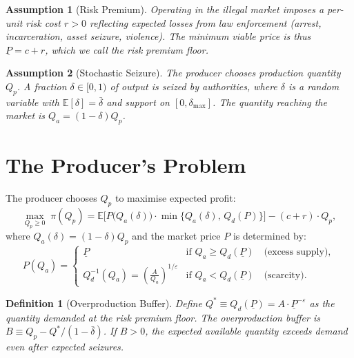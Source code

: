 \documentclass[12pt, a4paper]{article}
\newtheorem{assumption}{Assumption}
\newtheorem{definition}{Definition}
\begin{document}
\begin{assumption}[Risk Premium]
\label{ass:risk}
Operating in the illegal market imposes a per-unit risk cost $r > 0$ reflecting expected losses from law enforcement (arrest, incarceration, asset seizure, violence). The minimum viable price is thus $\underline{P} = c + r$, which we call the \textit{risk premium floor}.
\end{assumption}

\begin{assumption}[Stochastic Seizure]
\label{ass:seizure}
The producer chooses production quantity $Q_p$. A fraction $\delta \in [0,1)$ of output is seized by authorities, where $\delta$ is a random variable with $\mathbb{E}[\delta] = \bar{\delta}$ and support on $[0, \delta_{\max}]$. The quantity reaching the market is $Q_a = (1-\delta) Q_p$.
\end{assumption}

\section{The Producer's Problem}

The producer chooses $Q_p$ to maximise expected profit:
\begin{equation}
\max_{Q_p \geq 0} \; \pi(Q_p) = \mathbb{E}\Big[ P\big(Q_a(\delta)\big) \cdot \min\{Q_a(\delta), \, Q_d(P)\} \Big] - (c + r) \cdot Q_p,
\end{equation}
where $Q_a(\delta) = (1-\delta)Q_p$ and the market price $P$ is determined by:
\begin{equation}
\label{eq:price}
P(Q_a) = 
\begin{cases}
\underline{P} & \text{if } Q_a \geq Q_d(\underline{P}) \quad \text{(excess supply)}, \\[6pt]
Q_d^{-1}(Q_a) = \left(\frac{A}{Q_a}\right)^{1/\varepsilon} & \text{if } Q_a < Q_d(\underline{P}) \quad \text{(scarcity)}.
\end{cases}
\end{equation}

\begin{definition}[Overproduction Buffer]
Define $Q^* \equiv Q_d(\underline{P}) = A \cdot \underline{P}^{-\varepsilon}$ as the quantity demanded at the risk premium floor. The \textit{overproduction buffer} is $B \equiv Q_p - Q^*/(1-\bar{\delta})$. If $B > 0$, the expected available quantity exceeds demand even after expected seizures.
\end{definition}
\end{document}
